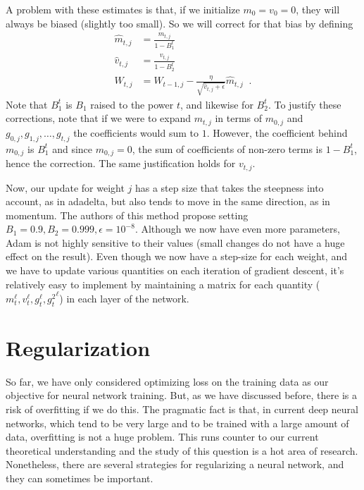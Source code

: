A problem with these estimates is that, if we initialize $m_0 = v_0 = 0$,
they will always be biased (slightly too small).  So we will correct
for that bias  by defining
\begin{align*}
  \hat{m}_{t,j} & = \frac{m_{t,j}}{1 - B^t_1}                     \\
  \hat{v}_{t,j} & = \frac{v_{t,j}}{1 - B^t_2}                     \\
  W_{t,j}       & = W_{t-1,j} - \frac{\eta}{\sqrt{\hat{v}_{t,j} +
      \epsilon}}\hat{m}_{t,j} \;\;.
\end{align*}
Note that $B^t_1$ is $B_1$ raised to the power $t$, and likewise for
$B^t_2$.  To justify these corrections, note that if we were to expand $m_{t,j}$
in terms of $m_{0,j}$ and $g_{0,j}, g_{1,j}, \dots, g_{t,j}$ the coefficients would
sum to $1$.  However, the coefficient behind $m_{0,j}$ is $B_1^t$ and since
$m_{0,j} = 0$, the sum of coefficients of non-zero terms is $1 - B_1^t$, hence
the correction.  The same justification holds for $v_{t,j}$.

Now, our update for weight $j$ has a step size that takes the
steepness into account, as in adadelta, but also tends to move in the
same direction, as in momentum.  The authors of this method propose
setting $B_1 = 0.9, B_2 = 0.999, \epsilon = 10^{-8}$.  Although we now
have even more parameters, Adam is not highly sensitive to their values
(small changes do not have a huge effect on the result).
Even though we now have a step-size for each weight, and we have to
update various quantities on each iteration of gradient descent, it's
relatively easy to implement by maintaining a matrix for each quantity
($ m^{\ell}_t, v^{\ell}_t, g^{\ell}_t, {g^{2}_t}^{\ell} $) in each
layer of the network.

\section{Regularization}
So far, we have only considered optimizing loss on the training data
as our objective for neural network training.   But, as we have
discussed before, there is a risk of overfitting if we do this.  The
pragmatic fact is that,  in current deep neural networks, which tend to be very
large and to be trained with a large amount of data,  overfitting is
not a huge problem.  This runs counter to our current theoretical
understanding and the study of this question is a hot area of
research.  Nonetheless, there are several strategies for regularizing
a neural network, and they can sometimes be important.

